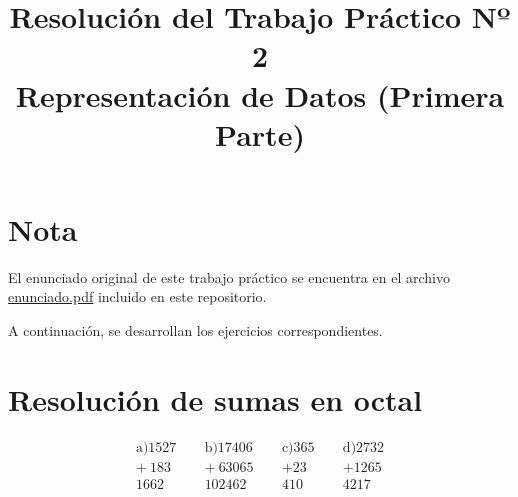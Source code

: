 \documentclass[12pt]{article}
\title{Resolución del Trabajo Práctico Nº 2\\\large Representación de Datos (Primera Parte)}
\date{\date{Mayo 2025}}
\begin{document}
\maketitle
\section*{Nota}

El enunciado original de este trabajo práctico se encuentra en el archivo \href{./enunciado.pdf}{enunciado.pdf} incluido en este repositorio.

\vspace{0.5cm}

A continuación, se desarrollan los ejercicios correspondientes.


\section{Resolución de sumas en octal}

\[
\begin{array}{r}
\text{a)}
  1527 \\
+ \ 183 \\
\hline
  1662
\end{array}
\quad\
\begin{array}{r}
\text{b)}
  17406 \\
+ \ 63065 \\
\hline
  102462
\end{array}
\quad\
\begin{array}{r}
\text{c)}
  365 \\
+ 23 \\
\hline
  410
\end{array}
\quad\
\begin{array}{r}
    \text{d)}
  2732 \\
+ 1265 \\
\hline
  4217
\end{array}
\]
\end{document}
